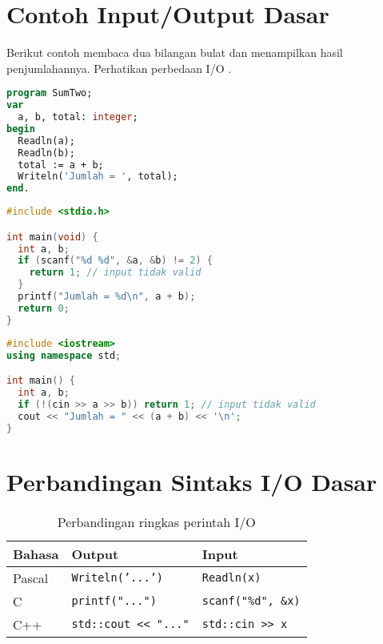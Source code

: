 \documentclass[../main.tex]{subfiles}
\begin{document}
\section{Contoh Input/Output Dasar}
Berikut contoh membaca dua bilangan bulat dan menampilkan hasil penjumlahannya. Perhatikan perbedaan I/O \parencite{w3pascal-io,gnu-c-manual,cpp-reference}.

\begin{lstlisting}[language=Pascal, caption={Menjumlah dua bilangan pada Pascal}]
program SumTwo;
var
  a, b, total: integer;
begin
  Readln(a);
  Readln(b);
  total := a + b;
  Writeln('Jumlah = ', total);
end.
\end{lstlisting}

\begin{lstlisting}[language=C, caption={Menjumlah dua bilangan pada C}]
#include <stdio.h>

int main(void) {
  int a, b;
  if (scanf("%d %d", &a, &b) != 2) {
    return 1; // input tidak valid
  }
  printf("Jumlah = %d\n", a + b);
  return 0;
}
\end{lstlisting}

\begin{lstlisting}[language=C++, caption={Menjumlah dua bilangan pada C++}]
#include <iostream>
using namespace std;

int main() {
  int a, b;
  if (!(cin >> a >> b)) return 1; // input tidak valid
  cout << "Jumlah = " << (a + b) << '\n';
}
\end{lstlisting}

\section{Perbandingan Sintaks I/O Dasar}
\begin{table}[H]
  \centering
  \caption{Perbandingan ringkas perintah I/O}
  \label{tab:io-basic}
  \begin{tabular}{@{}lll@{}}
    \toprule
    Bahasa & Output & Input \\
    \midrule
    Pascal & \texttt{Writeln('...')} & \texttt{Readln(x)} \\
    C      & \texttt{printf("...")} & \texttt{scanf("\%d", \&x)} \\
    C++    & \texttt{std::cout << "..."} & \texttt{std::cin >> x} \\
    \bottomrule
  \end{tabular}
\end{table}
\end{document}
